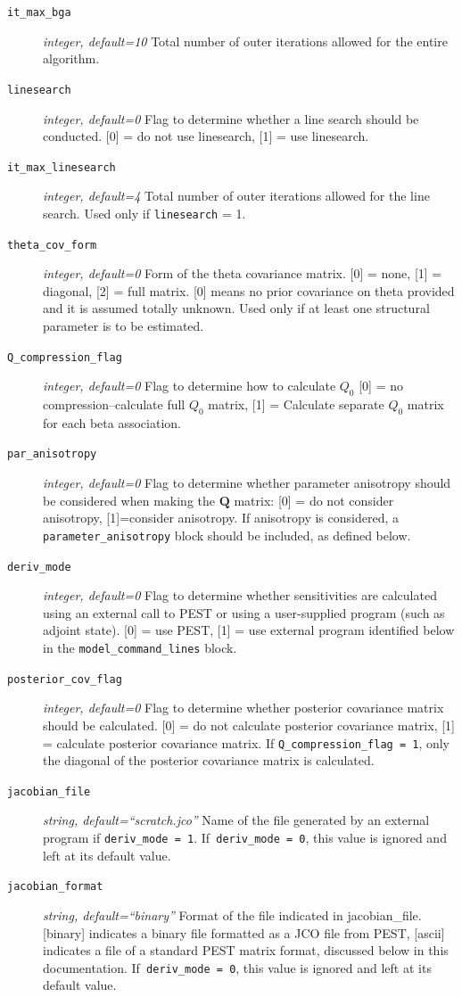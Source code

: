 \documentclass[11pt,oneside,onecolumn]{usgsreport}
\begin{document}
\begin{appendix}
\begin{bibunit}
\begin{description}
\item [{\texttt{it\_max\_bga}}] \emph{integer, default=10 }Total number
of outer iterations allowed for the entire algorithm. 
\item [{\texttt{linesearch}}] \emph{integer, default=0 }Flag to determine
whether a line search should be conducted. {[}0{]} = do not use linesearch,
{[}1{]} = use linesearch. 
\item [{\texttt{it\_max\_linesearch}}] \emph{integer, default=4 }Total
number of outer iterations allowed for the line search. Used only
if \texttt{linesearch} = 1. 
\item [{\texttt{theta\_cov\_form}}] \emph{integer, default=0} Form of the
theta covariance matrix. {[}0{]} = none, {[}1{]} = diagonal, {[}2{]}
= full matrix. {[}0{]} means no prior covariance on theta provided
and it is assumed totally unknown. Used only if at least one structural
parameter is to be estimated. 
\item [{\texttt{Q\_compression\_flag}}] \emph{integer, default=0 }Flag
to determine how to calculate $Q_{0}$ {[}0{]} = no compression--calculate
full $Q_{0}$ matrix, {[}1{]} = Calculate separate $Q_{0}$ matrix
for each beta association. 
\item [{\texttt{par\_anisotropy}}] \emph{integer, default=0 }Flag to determine
whether parameter anisotropy should be considered when making the
$\mathbf{Q}$ matrix: {[}0{]} = do not consider anisotropy, {[}1{]}=consider
anisotropy. If anisotropy is considered, a \texttt{parameter\_anisotropy}
block should be included, as defined below. 
\item [{\texttt{deriv\_mode}}] \emph{integer, default=0 }Flag to determine
whether sensitivities are calculated using an external call to PEST
or using a user-supplied program (such as adjoint state). {[}0{]}
= use PEST, {[}1{]} = use external program identified below in the
\texttt{model\_command\_lines} block. 
\item [{\texttt{posterior\_cov\_flag}}] \emph{integer, default=0 }Flag
to determine whether posterior covariance matrix should be calculated.
{[}0{]} = do not calculate posterior covariance matrix, {[}1{]} =
calculate posterior covariance matrix. If \texttt{Q\_compression\_flag
= 1}, only the diagonal of the posterior covariance matrix is calculated.

\item [{\texttt{jacobian\_file}}] \emph{string, default=``scratch.jco''
}Name of the file generated by an external program if \texttt{deriv\_mode
= 1}. If\texttt{ deriv\_mode = 0}, this value is ignored and left
at its default value. 
\item [{\texttt{jacobian\_format}}] \emph{string, default=``binary'' }Format
of the file indicated in jacobian\_file. {[}binary{]} indicates a
binary file formatted as a JCO file from PEST, {[}ascii{]} indicates
a file of a standard PEST matrix format, discussed below in this documentation.
If\texttt{ deriv\_mode = 0}, this value is ignored and left at its
default value. 
\end{description}


\end{bibunit}
\end{appendix}
\end{document}
